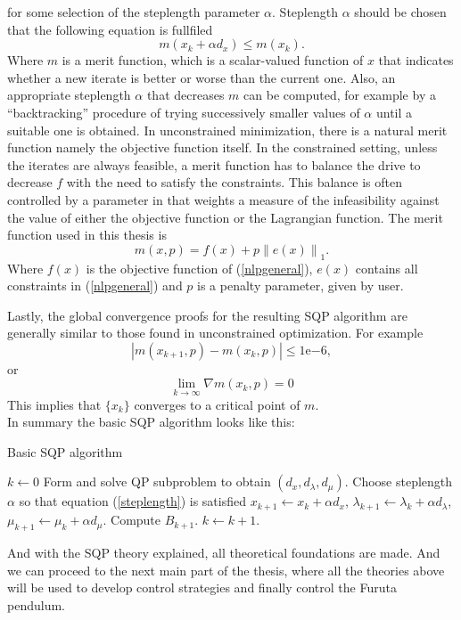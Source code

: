 for some selection of the steplength parameter $\alpha$. Steplength $\alpha$ should be chosen that the following equation is fullfiled
\begin{equation}\label{steplength}
	m(x_k + \alpha d_x)\leq m(x_k).
\end{equation}
Where $m$ is a merit function, which is a scalar-valued function of $x$ that indicates whether a new iterate is better or worse than the current one. Also, an appropriate steplength $\alpha$ that decreases $m$ can be computed, for example by a ``backtracking'' procedure of trying successively smaller values of $\alpha$ until a suitable one is obtained. In unconstrained minimization, there is a natural merit function namely the objective function itself. In the constrained setting, unless the iterates are always feasible, a merit function has to balance the drive to decrease $f$ with the need to satisfy the constraints. This balance is often controlled by a parameter in that weights a measure of the infeasibility against the value of either the objective function or the Lagrangian function. The merit function used in this thesis is
\begin{equation}
m(x,p) = f(x) + p\left\|e(x)\right\|_1.
\end{equation}
Where $f(x)$ is the objective function of (\ref{nlpgeneral}), $e(x)$ contains all constraints in (\ref{nlpgeneral}) and $p$ is a penalty parameter, given by user.

Lastly, the global convergence proofs for the resulting SQP algorithm are generally similar to those found in unconstrained optimization. For example 
\begin{equation}
	|m(x_{k+1},p) - m(x_{k},p)|\leq 1\mathrm{e}{-6},
\end{equation}
or
\begin{equation}
	\lim_{k\to\infty} \nabla m(x_{k},p) = 0
\end{equation}
This implies that $\{x_k\}$ converges to a critical point of $m$.\\

In summary the basic SQP algorithm looks like this:

\begin{algorithm}[H]
	\caption{Basic SQP algorithm}\label{SQP:algorithm}
	\begin{algorithmic}[1]
	\State $k\gets 0$
	\State Form and solve QP subproblem to obtain $(d_x,d_\lambda,d_\mu)$.
	\State Choose steplength $\alpha$ so that equation (\ref{steplength}) is satisfied
	\State 	$x_{k+1} \gets x_k + \alpha d_x$,
	\State $\lambda_{k+1} \gets \lambda_k + \alpha d_\lambda$,
	\State $\mu_{k+1} \gets \mu_k + \alpha d_\mu$.
	\State Compute $B_{k+1}$.
	\State $k \gets k+1$.
	\EndWhile
	\EndProcedure	
	\end{algorithmic}
\end{algorithm}	
And with the SQP theory explained, all theoretical foundations are made. And we can proceed to the next main part of the thesis, where all the theories above will be used to develop control strategies and finally control the Furuta pendulum.